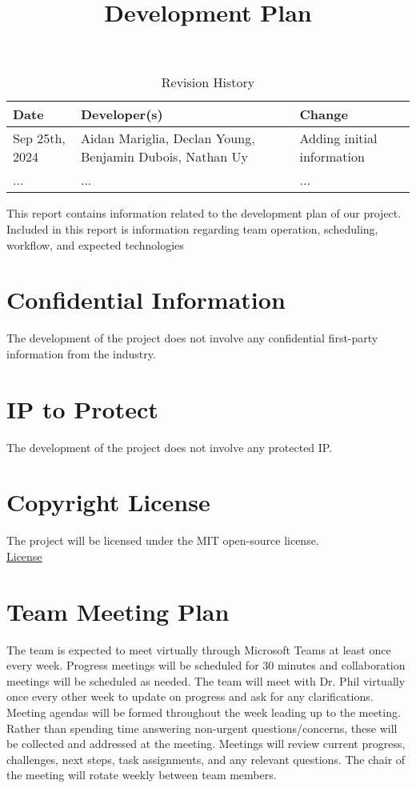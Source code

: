 \documentclass{article}
\title{Development Plan\\\progname}
\author{\authname}
\date{}
\begin{document}
\maketitle

\begin{table}[hp]
\caption{Revision History} \label{TblRevisionHistory}
\begin{tabularx}{\textwidth}{lp{5cm}X}
\toprule
\textbf{Date} & \textbf{Developer(s)} & \textbf{Change}\\
\midrule
Sep 25th, 2024 & Aidan Mariglia, Declan Young, Benjamin Dubois, Nathan Uy & Adding initial information \\
... & ... & ...\\
\bottomrule
\end{tabularx}
\end{table}

\newpage{}

This report contains information related to the development plan of our project. Included in this report is information regarding team operation, scheduling, workflow, and expected technologies

\section{Confidential Information}

The development of the project does not involve any confidential first-party information from the industry.

\section{IP to Protect}

The development of the project does not involve any protected IP.

\section{Copyright License}

The project will be licensed under the MIT open-source license. \\
\href{https://github.com/AidanMariglia/SOCAlgoTestPlatform/blob/main/LICENSE}{License}

\section{Team Meeting Plan}

The team is expected to meet virtually through Microsoft Teams at least once every week. Progress meetings will be scheduled for 30 minutes and collaboration meetings will be scheduled as needed. The team will meet with Dr. Phil virtually once every other week to update on progress and ask for any clarifications. Meeting agendas will be formed throughout the week leading up to the meeting. Rather than spending time answering non-urgent questions/concerns, these will be collected and addressed at the meeting. Meetings will review current progress, challenges, next steps, task assignments, and any relevant questions. The chair of the meeting will rotate weekly between team members.
\end{document}
